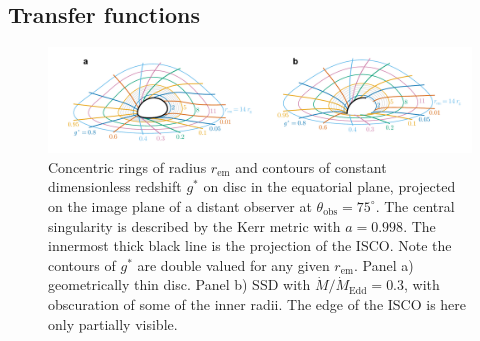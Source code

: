 \documentclass[fleqn,usenatbib]{mnras}
\begin{document}
\subsection{Transfer functions}
\label{sec:transfer-functions}

\begin{figure}
    \centering
    \includegraphics[width=0.95\linewidth]{figures/transfer-function.parameterization.pdf}
    \caption{Concentric rings of radius $r_\text{em}$ and contours of constant
    dimensionless redshift $g^\ast$ on disc in the equatorial plane, projected
on the image plane of a distant observer at $\theta_\text{obs} = 75^\circ$. The
central singularity is described by the Kerr metric with $a = 0.998$. The
innermost thick black line is the projection of the ISCO. Note the contours of
$g^\ast$ are double valued for any given $r_\text{em}$. Panel a) geometrically
thin disc. Panel b) SSD with $\dot{M} / \dot{M}_\text{Edd} = 0.3$, with
obscuration of some of the inner radii. The edge of the ISCO is here only
partially visible.}
    \label{fig:transfer-parameterisation}
\end{figure}
\end{document}
